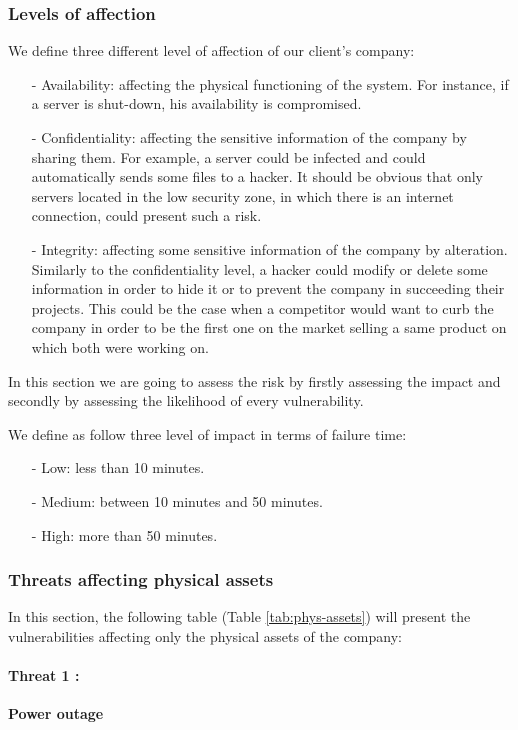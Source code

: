 \documentclass[a4paper,10pt]{article}
\begin{document}
\subsubsection{Levels of affection}
We define three different level of affection of our client's company:
\begin{enumerate}
\item[-] Availability: affecting the physical functioning of the system. For instance, if a server is shut-down, his availability is compromised.
\item[-] Confidentiality: affecting the sensitive information of the company by sharing them. For example, a server could be infected and could automatically sends some files to a hacker. It should be obvious that only servers located in the low security zone, in which there is an internet connection, could present such a risk.
\item[-] Integrity: affecting some sensitive information of the company by alteration. Similarly to the confidentiality level, a hacker could modify or delete some information in order to hide it or to prevent the company in succeeding their projects. This could be the case when a competitor would want to curb the company in order to be the first one on the market selling a same product on which both were working on.
\end{enumerate}

In this section we are going to assess the risk by firstly assessing the impact and secondly by assessing the likelihood of every vulnerability. 

We define as follow three level of impact in terms of failure time:
\begin{enumerate}
	\item[-] Low: less than 10 minutes.
	\item[-] Medium: between 10 minutes and 50 minutes.
	\item[-] High: more than 50 minutes.
\end{enumerate}

\subsubsection{Threats affecting physical assets}
In this section, the following table (Table \ref{tab:phys-assets}) will present the vulnerabilities affecting only the physical assets of the company:


\paragraph{Threat 1 :}  \textbf{Power outage} 
\end{document}
